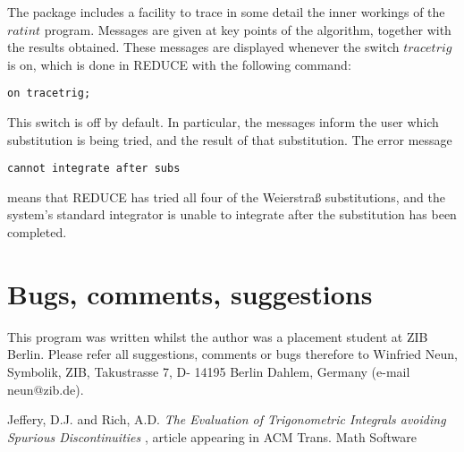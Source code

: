 The package includes a facility to trace in some detail the inner workings of the $ratint$ program. Messages are given at key points of the algorithm, together with the results obtained. These messages are displayed whenever the switch $tracetrig$ is on, which is done in \small{REDUCE} \normalsize with the following command:
\begin{verbatim}
on tracetrig;
\end{verbatim}
This switch is off by default. In particular, the messages inform the user which substitution is being tried, and the result of that substitution. The error message
\begin{verbatim}
cannot integrate after subs
\end{verbatim}
means that \small{REDUCE} \normalsize has tried all four of the Weierstra\ss \hspace{1 mm} substitutions, and the system's standard integrator is unable to integrate after the substitution has been completed.

\section{Bugs, comments, suggestions}
This program was written whilst the author was a placement student at ZIB Berlin. Please refer all suggestions, comments or bugs therefore to Winfried Neun, Symbolik, ZIB, Takustrasse 7, D- 14195 Berlin Dahlem, Germany (e-mail neun@zib.de).

\begin{thebibliography}{99999}

 Jeffery, D.J. and Rich, A.D.
{\it The Evaluation of Trigonometric Integrals avoiding Spurious Discontinuities
}, article appearing in ACM Trans. Math Software

\end{thebibliography}
